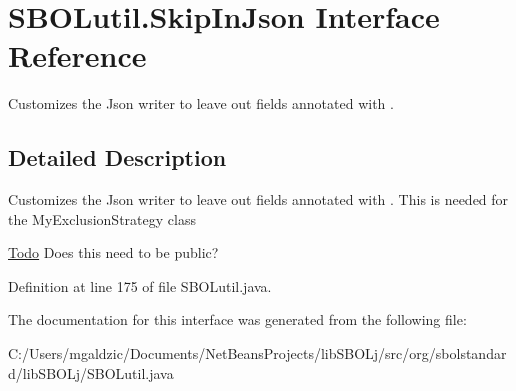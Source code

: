 \hypertarget{interfaceorg_1_1sbolstandard_1_1lib_s_b_o_lj_1_1_s_b_o_lutil_1_1_skip_in_json}{
\section{SBOLutil.SkipInJson Interface Reference}
\label{interfaceorg_1_1sbolstandard_1_1lib_s_b_o_lj_1_1_s_b_o_lutil_1_1_skip_in_json}
}


Customizes the Json writer to leave out fields annotated with .  




\subsection{Detailed Description}
Customizes the Json writer to leave out fields annotated with . This is needed for the MyExclusionStrategy class \begin{Desc}
\item[\hyperlink{todo__todo000006}{Todo}]Does this need to be public?\end{Desc}


Definition at line 175 of file SBOLutil.java.



The documentation for this interface was generated from the following file:\begin{DoxyCompactItemize}
\item 
C:/Users/mgaldzic/Documents/NetBeansProjects/libSBOLj/src/org/sbolstandard/libSBOLj/SBOLutil.java\end{DoxyCompactItemize}
